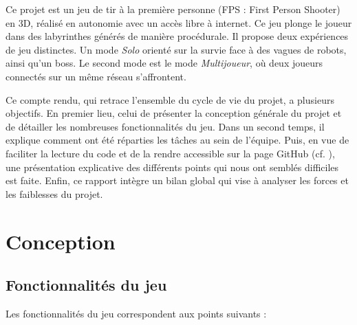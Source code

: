 \documentclass[a4paper,11pt]{article}
\begin{document}
Ce projet est un jeu de tir à la première personne (FPS : First Person Shooter) en 3D, réalisé en autonomie avec un accès libre à internet. Ce jeu plonge le joueur dans des labyrinthes générés de manière procédurale. Il propose deux expériences de jeu distinctes. Un mode \emph{Solo} orienté sur la survie face à des vagues de robots, ainsi qu'un boss. Le second mode est le mode \emph{Multijoueur}, où deux joueurs connectés sur un même réseau s'affrontent.

Ce compte rendu, qui retrace l'ensemble du cycle de vie du projet, a plusieurs objectifs. En premier lieu, celui de présenter la conception générale du projet et de détailler les nombreuses fonctionnalités du jeu. Dans un second temps, il explique comment ont été réparties les tâches au sein de l'équipe. Puis, en vue de faciliter la lecture du code et de la rendre accessible sur la page GitHub (cf. \cite{Github}), une présentation explicative des différents points qui nous ont semblés difficiles est faite. Enfin, ce rapport intègre un bilan global qui vise à analyser les forces et les faiblesses du projet.
\section{Conception}

\subsection{Fonctionnalités du jeu} \label{cdc}
\hspace*{1.5em}
Les fonctionnalités du jeu correspondent aux points suivants : 
\end{document}
